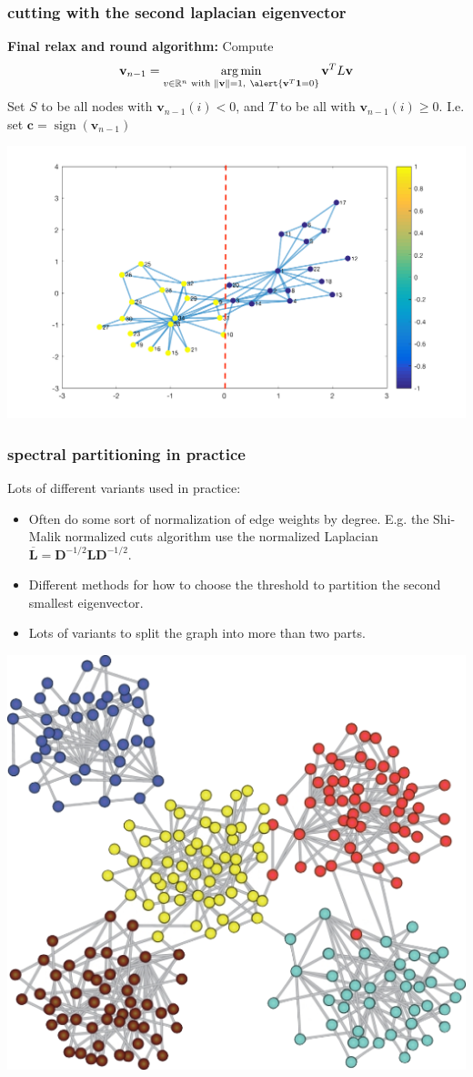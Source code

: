 \documentclass[compress]{beamer}
\newcommand{\bv}[1]{\mathbf{#1}}
\newcommand{\R}{\mathbb{R}}
\DeclareMathOperator*{\argmin}{arg\,min}
\DeclareMathOperator{\sign}{sign}
\newcommand{\norm}[1]{\|#1\|}
\begin{document}
\begin{frame}
	\frametitle{cutting with the  second laplacian eigenvector}
	\textbf{Final relax and round algorithm:} Compute 
	$$\bv{v}_{n-1} = \argmin_{v \in \R^n \text{ with } \norm{\bv{v}} = 1,\ \alert{\bv{v}^T \bv{1} = 0}} \bv{v}^T L \bv{v}$$ Set $S$ to be all nodes with $\bv{v}_{n-1}(i) < 0$, and $T$ to be all with $\bv{v}_{n-1}(i) \ge 0$. I.e. set $\bv{c} = \sign(\bv{v}_{n-1})$
	\begin{center}
		\vspace{-1em}
		\includegraphics[width=.9\textwidth]{cut2-fix.png}
	\end{center}
\end{frame}

\begin{frame}
	\frametitle{spectral partitioning in practice}
	Lots of different variants used in practice:
	\begin{itemize}
		\item Often do some sort of normalization of edge weights by degree. E.g. the Shi-Malik normalized cuts algorithm use the normalized Laplacian $\mathbf{\overline L} = \bv{D}^{-1/2} \bv{L} \bv{D}^{-1/2}$.
		\item Different methods for how to choose the threshold to partition the second smallest eigenvector.
		\item Lots of variants to split the graph into more than two parts.
	\end{itemize}
		\begin{center}
				\includegraphics[width=.33\textwidth]{multiway.png}
		\end{center}
\end{frame}
\end{document}

